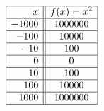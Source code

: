 \documentclass{ximera}
\begin{document}
 
 

\begin{center}
$\begin{array}{|r||c|}  \hline

 x &  f(x) = x^2  \\ \hline
 -1000 & 1000000 \\  \hline
 -100 & 10000 \\  \hline
 -10 & 100  \\  \hline
 0 &  0  \\  \hline
 10 & 100  \\  \hline
 100&  10000 \\  \hline
 1000 & 1000000 \\  \hline

\end{array}$
\end{center}

\begin{center}
\end{center}




 
\end{document}
